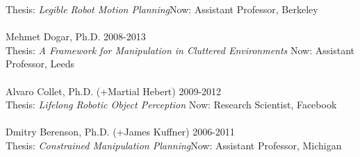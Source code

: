 Thesis: \textit{Legible Robot Motion Planning}\hfill Now: Assistant Professor, Berkeley\\
\\
Mehmet Dogar, Ph.D. \hfill 2008-2013\\
Thesis: \textit{A Framework for Manipulation in Cluttered Environments} \hfill Now: Assistant Professor, Leeds\\
\\
Alvaro Collet, Ph.D. (+Martial Hebert) \hfill 2009-2012\\
Thesis: \textit{Lifelong Robotic Object Perception} \hfill Now: Research Scientist, Facebook\\
\\
Dmitry Berenson, Ph.D. (+James Kuffner) \hfill 2006-2011\\
Thesis: \textit{Constrained Manipulation Planning}\hfill Now: Assistant Professor, Michigan\\

